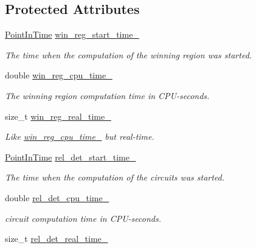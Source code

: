 \subsection*{Protected Attributes}
\begin{DoxyCompactItemize}
\item 
\hyperlink{Stopwatch_8h_af3a9f634f27bed7e98dbc23e5c6f807d}{Point\-In\-Time} \hyperlink{classLearnStatisticsSAT_a04c8091b3380c8d756d40aabeefbfbe1}{win\-\_\-reg\-\_\-start\-\_\-time\-\_\-}
\begin{DoxyCompactList}\small\item\em The time when the computation of the winning region was started. \end{DoxyCompactList}\item 
double \hyperlink{classLearnStatisticsSAT_af9823be5155743223790ae01b91b7ca8}{win\-\_\-reg\-\_\-cpu\-\_\-time\-\_\-}
\begin{DoxyCompactList}\small\item\em The winning region computation time in C\-P\-U-\/seconds. \end{DoxyCompactList}\item 
size\-\_\-t \hyperlink{classLearnStatisticsSAT_a97f7a6ccfc2d6677ae8a6c16dddd6b71}{win\-\_\-reg\-\_\-real\-\_\-time\-\_\-}
\begin{DoxyCompactList}\small\item\em Like \hyperlink{classLearnStatisticsSAT_af9823be5155743223790ae01b91b7ca8}{win\-\_\-reg\-\_\-cpu\-\_\-time\-\_\-} but real-\/time. \end{DoxyCompactList}\item 
\hyperlink{Stopwatch_8h_af3a9f634f27bed7e98dbc23e5c6f807d}{Point\-In\-Time} \hyperlink{classLearnStatisticsSAT_af02bb7ecbdb583b8c49191581dcbe607}{rel\-\_\-det\-\_\-start\-\_\-time\-\_\-}
\begin{DoxyCompactList}\small\item\em The time when the computation of the circuits was started. \end{DoxyCompactList}\item 
double \hyperlink{classLearnStatisticsSAT_aa7d1ca100b6ad0500931ca80d1439f28}{rel\-\_\-det\-\_\-cpu\-\_\-time\-\_\-}
\begin{DoxyCompactList}\small\item\em circuit computation time in C\-P\-U-\/seconds. \end{DoxyCompactList}\item 
size\-\_\-t \hyperlink{classLearnStatisticsSAT_a65bb33d1f5088fc9ed2f947b87e8d4cb}{rel\-\_\-det\-\_\-real\-\_\-time\-\_\-}

\end{DoxyCompactItemize}

